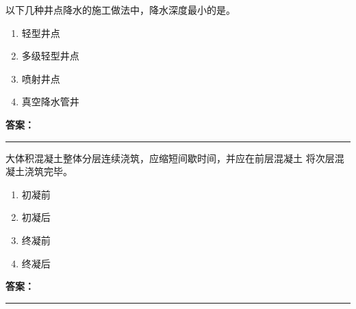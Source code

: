 \documentclass[UTF8,fontset=fandol,11pt]{ctexart}
\newcommand{\answerline}{\textcolor{answerred}{\rule{2.4cm}{0.7pt}}}
\begin{document}
\begin{quizbox}[title={乱序第 199 题｜第三章基坑工程}]

以下几种井点降水的施工做法中，降水深度最小的是。\\

\begin{enumerate}[label=\Alph*.]

\item 轻型井点

\item 多级轻型井点

\item 喷射井点

\item 真空降水管井

\end{enumerate}

\textbf{\textcolor{answerred}{答案：}} \answerline

\end{quizbox}

\vspace{0.2em}

\begin{quizbox}[title={乱序第 200 题｜第四章混凝土结构工程}]

大体积混凝土整体分层连续浇筑，应缩短间歇时间，并应在前层混凝土 将次层混凝土浇筑完毕。\\

\begin{enumerate}[label=\Alph*.]

\item 初凝前

\item 初凝后

\item 终凝前

\item 终凝后

\end{enumerate}

\textbf{\textcolor{answerred}{答案：}} \answerline

\end{quizbox}

\vspace{0.2em}
\end{document}
